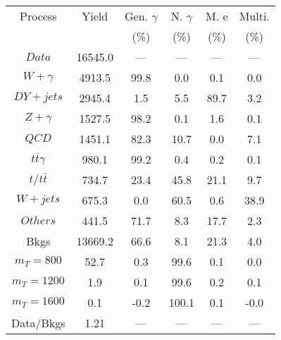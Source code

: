 \begin{figure}
\begin{minipage}[c]{0.32\textwidth}
\tiny{
\begin{tabular}{cccccc}
\hline
Process & Yield & Gen. $\gamma$ & N. $\gamma$ & M. e & Multi. \\
 &  & (\%) & (\%) & (\%) & (\%)  \\
\hline
                                                                      $ Data $ &  16545.0 &  --- &  --- &  --- &  ---\\
$ W+\gamma $ &  4913.5 &  99.8 &  0.0 &  0.1 &  0.0\\
$ DY+jets $ &  2945.4 &  1.5 &  5.5 &  89.7 &  3.2\\
$ Z+\gamma $ &  1527.5 &  98.2 &  0.1 &  1.6 &  0.1\\
$ QCD $ &  1451.1 &  82.3 &  10.7 &  0.0 &  7.1\\
$ t\bar{t}\gamma $ &  980.1 &  99.2 &  0.4 &  0.2 &  0.1\\
$ t/t\bar{t} $ &  734.7 &  23.4 &  45.8 &  21.1 &  9.7\\
$ W+jets $ &  675.3 &  0.0 &  60.5 &  0.6 &  38.9\\
$ Others $ &  441.5 &  71.7 &  8.3 &  17.7 &  2.3\\
Bkgs &  13669.2 &  66.6 &  8.1 &  21.3 &  4.0\\
$ m_{T} = 800 $ &  52.7 &  0.3 &  99.6 &  0.1 &  0.0\\
$ m_{T} = 1200 $ &  1.9 &  0.1 &  99.6 &  0.2 &  0.1\\
$ m_{T} = 1600 $ &  0.1 &  -0.2 &  100.1 &  0.1 &  -0.0\\
Data/Bkgs &  1.21 &  --- &  --- &  --- &  ---\\
\hline
\end{tabular}
}
\end{minipage}
\end{figure}

